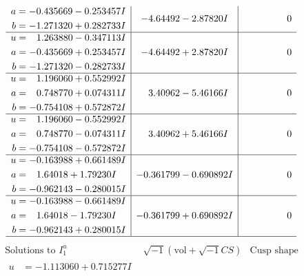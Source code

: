 \documentclass[1p]{elsarticle_modified}
\theoremstyle{definition}
\newcommand{\I}{\sqrt{-1}}
\begin{document}
$$\begin{array}{c|c|c}
\begin{aligned}
a &= -0.435669 - 0.253457 I \\
b &= -1.271320 + 0.282733 I\end{aligned}
 & -4.64492 - 2.87820 I & \phantom{-0.000000 } 0 \\ \hline\begin{aligned}
u &= \phantom{-}1.263880 - 0.347113 I \\
a &= -0.435669 + 0.253457 I \\
b &= -1.271320 - 0.282733 I\end{aligned}
 & -4.64492 + 2.87820 I & \phantom{-0.000000 } 0 \\ \hline\begin{aligned}
u &= \phantom{-}1.196060 + 0.552992 I \\
a &= \phantom{-}0.748770 + 0.074311 I \\
b &= -0.754108 + 0.572872 I\end{aligned}
 & \phantom{-}3.40962 - 5.46166 I & \phantom{-0.000000 } 0 \\ \hline\begin{aligned}
u &= \phantom{-}1.196060 - 0.552992 I \\
a &= \phantom{-}0.748770 - 0.074311 I \\
b &= -0.754108 - 0.572872 I\end{aligned}
 & \phantom{-}3.40962 + 5.46166 I & \phantom{-0.000000 } 0 \\ \hline\begin{aligned}
u &= -0.163988 + 0.661489 I \\
a &= \phantom{-}1.64018 + 1.79230 I \\
b &= -0.962143 - 0.280015 I\end{aligned}
 & -0.361799 - 0.690892 I & \phantom{-0.000000 } 0 \\ \hline\begin{aligned}
u &= -0.163988 - 0.661489 I \\
a &= \phantom{-}1.64018 - 1.79230 I \\
b &= -0.962143 + 0.280015 I\end{aligned}
 & -0.361799 + 0.690892 I & \phantom{-0.000000 } 0\\
 \hline 
 \end{array}$$\newpage$$\begin{array}{c|c|c}  
\text{Solutions to }I^u_{1}& \I (\text{vol} + \sqrt{-1}CS) & \text{Cusp shape}\\
 \hline 
\begin{aligned}
u &= -1.113060 + 0.715277 I \\

\end{aligned}
\end{array}$$
\end{document}
